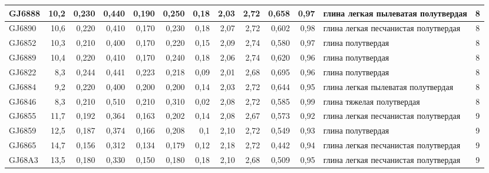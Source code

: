 \begin{table}
\begin{tabular}{@{}|l|r|r|r|r|r|r|r|r|r|r|l|c|@{}}
    GJ6888          & 10,2       & 0,230                        & 0,440   & 0,190  & 0,250  & 0,18     & 2,03     & 2,72      & 0,658   & 0,97     & глина легкая   пылеватая полутвердая         & 8   \\ \hline
    GJ6890          & 10,6       & 0,220                        & 0,410   & 0,170  & 0,230  & 0,18     & 2,07     & 2,72      & 0,602   & 0,98     & глина легкая   песчанистая полутвердая       & 8   \\ \hline
    GJ6852          & 10,3       & 0,210                        & 0,400   & 0,170  & 0,220  & 0,15     & 2,09     & 2,74      & 0,580   & 0,97     & глина полутвердая                            & 8   \\ \hline
    GJ6889          & 10,4       & 0,220                        & 0,410   & 0,170  & 0,240  & 0,18     & 2,06     & 2,74      & 0,620   & 0,96     & глина полутвердая                            & 8   \\ \hline
    GJ6822          & 8,3        & 0,244                        & 0,441   & 0,223  & 0,218  & 0,09     & 2,01     & 2,68      & 0,695   & 0,96     & глина полутвердая                            & 8   \\ \hline
    GJ6884          & 9,2        & 0,220                        & 0,400   & 0,200  & 0,200  & 0,14     & 2,03     & 2,72      & 0,644   & 0,95     & глина легкая   пылеватая полутвердая         & 8   \\ \hline
    GJ6846          & 8,3        & 0,210                        & 0,510   & 0,210  & 0,310  & 0,02     & 2,08     & 2,72      & 0,585   & 0,99     & глина тяжелая   полутвердая                  & 8   \\ \hline
    GJ6855          & 11,7       & 0,192                        & 0,364   & 0,163  & 0,202  & 0,14     & 2,08     & 2,67      & 0,573   & 0,92     & глина легкая   песчанистая полутвердая       & 9   \\ \hline
    GJ6859          & 12,5       & 0,187                        & 0,374   & 0,166  & 0,208  & 0,1      & 2,10     & 2,72      & 0,549   & 0,93     & глина полутвердая                            & 9   \\ \hline
    GJ6865          & 14,7       & 0,156                        & 0,312   & 0,134  & 0,179  & 0,12     & 2,18     & 2,72      & 0,442   & 0,94     & глина легкая   песчанистая полутвердая       & 9   \\ \hline
    GJ68A3          & 13,5       & 0,180                        & 0,330   & 0,150  & 0,180  & 0,18     & 2,10     & 2,68      & 0,509   & 0,95     & глина легкая   песчанистая полутвердая       & 9   \\ \hline

\end{tabular}
\end{table}
